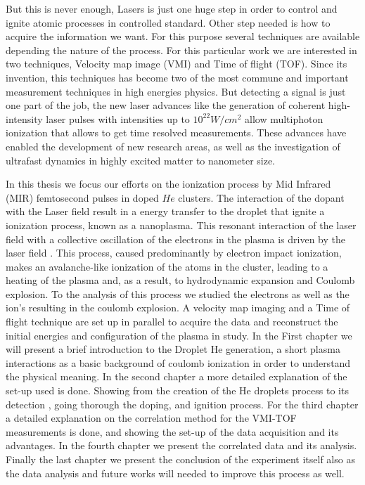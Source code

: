 But this is never enough, Lasers is just one huge step in order to control and ignite atomic processes in controlled standard. Other step needed is how to acquire the information we want. For this purpose several techniques are available  depending the nature of the process. For this particular  work we are interested in two  techniques, Velocity map image (VMI) and Time of flight (TOF).
Since its invention, this techniques  has become two of the most commune and important measurement techniques in high energies physics.
But detecting a signal is just one part of the job, the new laser advances like the  generation of coherent high-intensity laser pulses with intensities up to $10^{22} W/cm^{2}$  allow multiphoton ionization that allows to get time resolved measurements. These advances have enabled the development of new research areas, as well as the investigation of ultrafast dynamics in highly excited matter to nanometer size.

In this thesis we focus our efforts  on the ionization process by Mid Infrared (MIR) femtosecond pulses in doped $He$ clusters. The interaction of the dopant with the Laser field result in a energy transfer to the droplet that ignite a ionization process, known as a nanoplasma. This resonant interaction of the laser field with a collective oscillation of the electrons in the plasma is driven by the laser field \cite{fennel_laser-driven_2010}. This process, caused predominantly by electron impact ionization, makes an avalanche-like ionization of the atoms in the cluster, leading to a heating of the plasma and, as a result, to hydrodynamic expansion and Coulomb explosion. To the analysis of this process we studied the electrons as well as the ion's resulting in the coulomb explosion. A velocity map imaging and a Time of flight technique are set up in parallel to acquire the data and reconstruct the initial energies and configuration of the plasma in study. 
In the First chapter we will present a brief introduction to the Droplet He generation, a short plasma interactions as a basic background of coulomb ionization in order to understand the physical meaning.
In the second chapter a more detailed explanation of the set-up used is done. Showing from the creation of the He droplets process to its detection , going thorough the doping, and ignition process.
For the third chapter a detailed explanation on the correlation method for the VMI-TOF measurements is done, and showing the set-up of the data acquisition and its advantages.
In the fourth chapter we present the correlated data and its analysis. Finally the last chapter we present the conclusion of the experiment itself also as the data analysis and future works will needed to improve this process as well.

